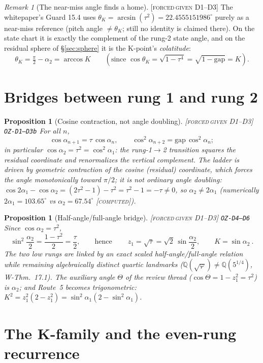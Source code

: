 \documentclass[11pt]{article}
\newcommand{\tagFD}{\textcolor{cF}{\textsc{[forced}}\,\textcolor{cD}{\textsc{given D1--D3]}}}
\newcommand{\tagC}{\textcolor{cC}{\textsc{[computed]}}}
\newcommand{\hx}[1]{\textcolor{cC}{\footnotesize\texttt{#1}}}
\newcommand{\Q}{\mathbb{Q}}
\newcommand{\gp}{\varphi}
\newcommand{\gapc}{\mathrm{gap}}
\theoremstyle{plain}
\newtheorem{proposition}[theorem]{Proposition}
\theoremstyle{definition}
\theoremstyle{remark}
\newtheorem{remark}[theorem]{Remark}
\begin{document}
\begin{remark}[The near-miss angle finds a home]\label{rem:thetaK}\tagFD{}
The whitepaper's Guard 15.4 uses $\theta_K=\arcsin(\tau^2)=22.4555151986^\circ$
purely as a near-miss reference (pitch angle $\neq\theta_K$; still no identity is
claimed there). On the state chart it is exactly the complement of the rung-2
state angle, and on the residual sphere of \S\ref{sec:sphere} it is the K-point's
\emph{colatitude}:
\[
\theta_K=\tfrac\pi2-\alpha_2=\arccos K
\qquad(\text{since }\cos\theta_K=\sqrt{1-\tau^4}=\sqrt{1-\gapc}=K).
\]
\end{remark}

\section{Bridges between rung 1 and rung 2}\label{sec:bridges}

\begin{proposition}[Cosine contraction, not angle doubling]\label{prop:contraction}\tagFD{} \hx{OZ-D1--D3b}
For all $n$,
\[
\cos\alpha_{n+1}=\tau\,\cos\alpha_n,
\qquad
\cos^2\alpha_{n+2}=\gapc\,\cos^2\alpha_n ;
\]
in particular $\cos\alpha_2=\tau^2=\cos^2\alpha_1$: the rung-1$\to$2
transition squares the residual coordinate and renormalizes the vertical
complement. The ladder is driven by geometric contraction of the cosine
(residual) coordinate, which forces the angle monotonically toward $\pi/2$; it is \emph{not} ordinary angle doubling:
$\cos2\alpha_1-\cos\alpha_2=(2\tau^2-1)-\tau^2=\tau^2-1=-\tau\neq0$, so
$\alpha_2\neq2\alpha_1$ (numerically $2\alpha_1=103.65^\circ$ vs
$\alpha_2=67.54^\circ$ \tagC{}).
\end{proposition}

\begin{proposition}[Half-angle/full-angle bridge]\label{prop:halfangle}\tagFD{} \hx{OZ-D4--D6}
Since $\cos\alpha_2=\tau^2$,
\[
\sin^2\frac{\alpha_2}{2}=\frac{1-\tau^2}{2}=\frac{\tau}{2},
\qquad\text{hence}\qquad
\boxed{\ z_1=\sqrt\tau=\sqrt2\,\sin\frac{\alpha_2}{2},\qquad K=\sin\alpha_2\ }.
\]
The two low rungs are linked by an exact scaled half-angle/full-angle relation
while remaining algebraically distinct quartic landmarks
($\Q(\sqrt\gp)\neq\Q(5^{1/4})$, W-Thm.\ 17.1). The auxiliary angle $\Theta$ of the
review thread ($\cos\Theta=1-z_1^2=\tau^2$) \emph{is} $\alpha_2$; and Route~5
becomes trigonometric: $K^2=z_1^2(2-z_1^2)=\sin^2\alpha_1(2-\sin^2\alpha_1)$.
\end{proposition}

\section{The K-family and the even-rung recurrence}\label{sec:kfamily}
\end{document}
